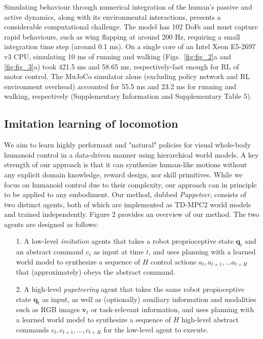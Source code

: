 \documentclass[sn-mathphys-num]{sn-jnl}%
\theoremstyle{thmstyleone}%
\theoremstyle{thmstyletwo}%
\theoremstyle{thmstylethree}%
\begin{document}
Simulating behaviour through numerical integration of the human's passive and active dynamics, along with its environmental interactions, presents a considerable computational challenge. 
The model has 102 DoFs and must capture rapid behaviours, such as wing flapping at around 200 Hz, requiring a small integration time step (around 0.1 ms).
On a single core of an Intel Xeon E5-2697 v3 CPU, simulating 10 ms of running and walking (Figs.~\ref{fig:fig_2}a and \ref{fig:fig_3}a) took 421.5 ms and 58.65 ms, respectively-fast enough for RL of motor control.
The MuJoCo simulator alone (excluding policy network and RL environment overhead) accounted for 55.5 ms and 23.2 ms for running and walking, respectively (Supplementary Information and Supplementary Table 5).




\subsection{Imitation learning of locomotion}


We aim to learn highly performant and "natural" policies for visual whole-body humanoid control in a data-driven manner using hierarchical world models.
A key strength of our approach is that it can synthesize human-like motions without any explicit domain knowledge, reward design, nor skill primitives.
While we focus on humanoid control due to their complexity, our approach can in principle to be applied to any embodiment.
Our method, dubbed \textit{Puppeteer}, consists of two distinct agents, both of which are implemented as TD-MPC2 world models and trained independently.
Figure 2 provides an overview of our method.
The two agents are designed as follows:

\begin{itemize}
	\item[1.] 
	A low-level \textit{imitation} agents that takes a robot proprioceptive state $ \mathbf{q}_t $ and an abstract command $ c_t $ as input at time $ t $, and uses planning with a learned world model to synthesize a sequence of $ H $ control actions $ {a_t, a_{t+1}, ... a_{t+H}} $ that (approximately) obeys the abstract command.
	\item[2.] 
	A high-level \textit{pupeteering} agent that takes the same robot propioceptive state $ \mathbf{q}_t $ as input, as well as (optionally) auxiliary information and modalities such as RGB images $ \mathbf{v}_t $ or task-relevant information, and uses planning with a learned world model to synthesize a sequence of $ H $ high-level abstract commands $ {c_t, c_{t+1}, ..., c_{t+H}} $ for the low-level agent to execute.
\end{itemize}
\end{document}
